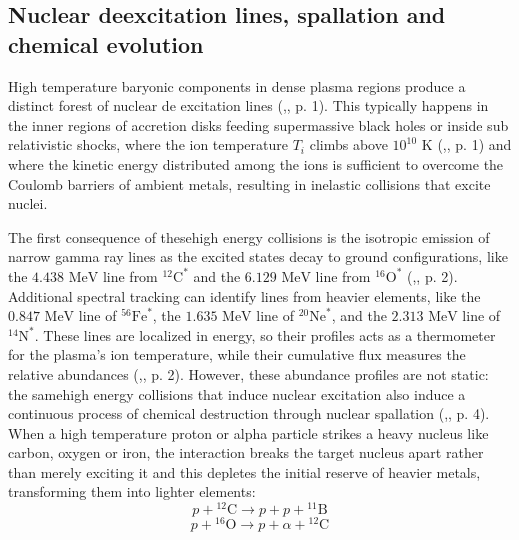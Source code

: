 \documentclass{aa} %
\begin{document}
\subsection{Nuclear deexcitation lines, spallation and chemical evolution}
High temperature baryonic components in dense plasma regions produce a distinct forest of nuclear de excitation lines (\citet{Boettcheretal1996},\citet{Kafexhiuetal2019}, p. 1). This typically happens in the inner regions of accretion disks feeding supermassive black holes or inside sub relativistic shocks, where the ion temperature $T_i$ climbs above $10^{10}\text{ K}$ (\citet{Boettcheretal1996},\citet{Kafexhiuetal2019}, p. 1) and where the kinetic energy distributed among the ions is sufficient to overcome the Coulomb barriers of ambient metals, resulting in inelastic collisions that excite nuclei.

The first consequence of thesehigh energy collisions is the isotropic emission of narrow gamma ray lines as the excited states decay to ground configurations, like the $4.438\text{ MeV}$ line from $^{12}\text{C}^*$ and the $6.129\text{ MeV}$ line from $^{16}\text{O}^*$ (\citet{Boettcheretal1996},\citet{Kafexhiuetal2019}, p. 2). Additional spectral tracking can identify lines from heavier elements, like the $0.847\text{ MeV}$ line of $^{56}\text{Fe}^*$, the $1.635\text{ MeV}$ line of $^{20}\text{Ne}^*$, and the $2.313\text{ MeV}$ line of $^{14}\text{N}^*$. These lines are localized in energy, so their profiles acts as a thermometer for the plasma’s ion temperature, while their cumulative flux measures the relative abundances (\citet{Boettcheretal1996},\citet{Kafexhiuetal2019}, p. 2).
However, these abundance profiles are not static: the samehigh energy collisions that induce nuclear excitation also induce a continuous process of chemical destruction through nuclear spallation (\citet{Boettcheretal1996},\citet{Kafexhiuetal2019}, p. 4). When a high temperature proton or alpha particle strikes a heavy nucleus like carbon, oxygen or iron, the interaction breaks the target nucleus apart rather than merely exciting it and this depletes the initial reserve of heavier metals, transforming them into lighter elements:
\begin{equation}
    p + {}^{12}\text{C} \rightarrow p + p + {}^{11}\text{B}
\end{equation}
\begin{equation}
    p + {}^{16}\text{O} \rightarrow p + \alpha + {}^{12}\text{C}
\end{equation}
\end{document}
